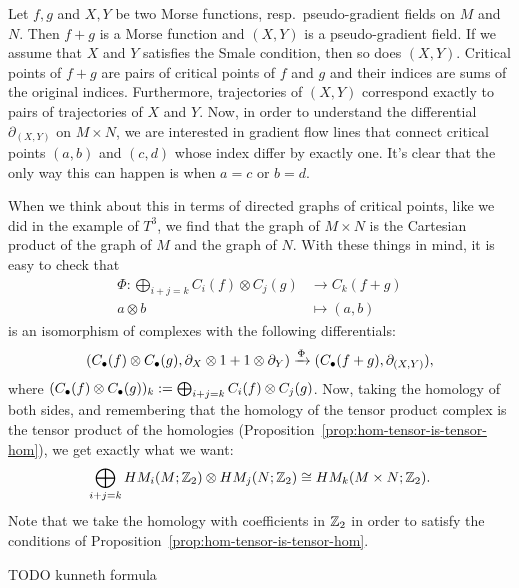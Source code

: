 \begin{myproof}
    Let $f, g$ and $X, Y$ be two Morse functions, resp.\ pseudo-gradient fields on  $M$ and  $N$.
    Then $f + g$ is a Morse function and $(X, Y)$ is a pseudo-gradient field. If we assume that $X$ and  $Y$ satisfies the Smale condition, then so does $(X,Y)$.
    Critical points of $f+g$ are pairs of critical points of $f$ and $g$ and their indices are sums of the original indices.
    Furthermore, trajectories of $(X, Y)$ correspond exactly to pairs of trajectories of $X$ and $Y$.
    Now, in order to understand the differential $\partial_{(X, Y)}$ on $M \times N$, we are interested in gradient flow lines that connect critical points $(a,b)$ and  $(c,d)$ whose index differ by exactly one.
    It's clear that the only way this can happen is when $a = c$ or $b = d$.

    When we think about this in terms of directed graphs of critical points, like we did in the example of $T^{3}$, we find that the graph of $M \times N$ is the Cartesian product of the graph of $M$ and the graph of  $N$.
    With these things in mind, it is easy to check that
    \begin{align*}
        \Phi: \bigoplus_{i+j = k} C_i(f) \otimes C_j(g) &\longrightarrow C_k(f+g) \\
        a \otimes b &\longmapsto (a,b)
    \end{align*}
    is an isomorphism of complexes with the following differentials:
    \[
        (C_\bul(f) \otimes C_\bul(g), \partial_X \otimes 1 + 1 \otimes \partial_Y) \xrightarrow{\Phi}   (C_\bul(f+g), \partial_{(X,Y)})
    ,\]
    where $(C_\bul(f) \otimes C_\bul(g))_k := \bigoplus_{i+j = k} C_i(f) \otimes C_j(g)$.
    Now, taking the homology of both sides, and remembering that the homology of the tensor product complex is the tensor product of the homologies (Proposition~\ref{prop:hom-tensor-is-tensor-hom}), we get exactly what we want:
    \[
        \bigoplus_{i+j = k} \HMf[i]{M; \Z_2} \otimes \HMf[j]{N; \Z_2} \cong \HMf[k]{M \times N; \Z_2}
    .\]
    Note that we take the homology with coefficients in $\Z_2$ in order to satisfy the conditions of Proposition~\ref{prop:hom-tensor-is-tensor-hom}.
\begin{marginfigure}
    \centering
    \caption{TODO kunneth formula}
    \label{fig:kunneth-formula}
\end{marginfigure}
\end{myproof}


